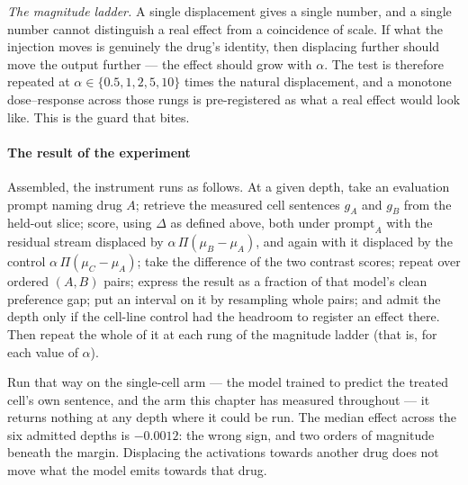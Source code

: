 \emph{The magnitude ladder.} A single displacement gives a single number, and a
single number cannot distinguish a real effect from a coincidence of scale. If
what the injection moves is genuinely the drug's identity, then displacing
further should move the output further --- the effect should grow with $\alpha$.
The test is therefore repeated at $\alpha \in \{0.5, 1, 2, 5, 10\}$ times the
natural displacement, and a monotone dose--response across those rungs is
pre-registered as what a real effect would look like. This is the guard that
bites.

\paragraph{The result of the experiment}
Assembled, the instrument runs as follows. At a given depth, take an evaluation prompt
naming drug $A$; retrieve the measured cell sentences $g_A$ and $g_B$ from the
held-out slice; score, using $\Delta$ as defined above, both under $\textrm{prompt}_A$ with the residual stream
displaced by $\alpha\,\Pi(\mu_B - \mu_A)$, and again with it displaced by the
control $\alpha\,\Pi(\mu_C - \mu_A)$; take the difference of the two contrast
scores; repeat over ordered $(A,B)$ pairs; express the result as a fraction of
that model's clean preference gap; put an interval on it by resampling whole
pairs; and admit the depth only if the cell-line control had the headroom to
register an effect there. Then repeat the whole of it at each rung of the
magnitude ladder (that is, for each value of $\alpha$).

Run that way on the single-cell arm --- the model trained to predict the treated
cell's own sentence, and the arm this chapter has measured throughout --- it
returns nothing at any depth where it could be run. The median effect across the
six admitted depths is $-0.0012$: the wrong sign, and two orders of magnitude
beneath the margin. Displacing the activations towards another drug does not
move what the model emits towards that drug.

